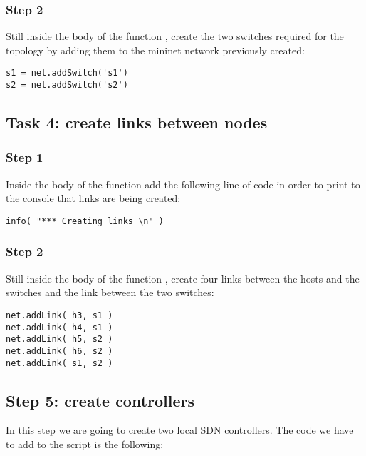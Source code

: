 \subsubsection*{Step 2}
Still inside the body of the function , create the
two switches required for the topology by adding them to the mininet network
previously created:
\begin{lstlisting}
s1 = net.addSwitch('s1')
s2 = net.addSwitch('s2')
\end{lstlisting}







\subsection*{Task 4: create links between nodes}
\subsubsection*{Step 1}
Inside the body of the function  add the following line
of code in order to print to the console that links are being created:
\begin{lstlisting}
info( "*** Creating links \n" )
\end{lstlisting}

\subsubsection*{Step 2}
Still inside the body of the function , create four
links between the hosts and the switches and the link between the two switches:
\begin{lstlisting}
net.addLink( h3, s1 )
net.addLink( h4, s1 )
net.addLink( h5, s2 )
net.addLink( h6, s2 )
net.addLink( s1, s2 )
\end{lstlisting}








\subsection*{Step 5: create controllers} \label{sec:step-5}
In this step we are going to create two local SDN controllers. The code we have to
add to the script is the following:

 \\
 \\

